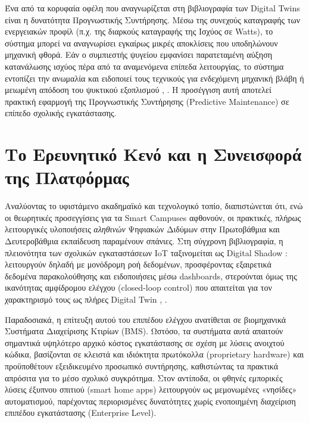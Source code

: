 Ένα από τα κορυφαία οφέλη που αναγνωρίζεται στη βιβλιογραφία των \textlatin{Digital Twins} είναι η δυνατότητα Προγνωστικής Συντήρησης. Μέσω της συνεχούς καταγραφής των ενεργειακών προφίλ (π.χ. της διαρκούς καταγραφής της Ισχύος σε \textlatin{Watts}), το σύστημα μπορεί να αναγνωρίσει εγκαίρως μικρές αποκλίσεις που υποδηλώνουν μηχανική φθορά. Εάν ο συμπιεστής ψυγείου εμφανίσει παρατεταμένη αύξηση κατανάλωσης ισχύος πέρα από τα αναμενόμενα επίπεδα λειτουργίας, το σύστημα εντοπίζει την ανωμαλία και ειδοποιεί τους τεχνικούς για ενδεχόμενη μηχανική βλάβη ή μειωμένη απόδοση του ψυκτικού εξοπλισμού \cite{Cabrera2020}, \cite{Han2022}. Η προσέγγιση αυτή αποτελεί πρακτική εφαρμογή της Προγνωστικής Συντήρησης (\textlatin{Predictive Maintenance}) σε επίπεδο σχολικής εγκατάστασης.

\section{Το Ερευνητικό Κενό και η Συνεισφορά της Πλατφόρμας}
Αναλύοντας το υφιστάμενο ακαδημαϊκό και τεχνολογικό τοπίο, διαπιστώνεται ότι, ενώ οι θεωρητικές προσεγγίσεις για τα \textlatin{Smart Campuses} αφθονούν, οι πρακτικές, πλήρως λειτουργικές υλοποιήσεις \textit{αληθινών} Ψηφιακών Διδύμων στην Πρωτοβάθμια και Δευτεροβάθμια εκπαίδευση παραμένουν σπάνιες. Στη σύγχρονη βιβλιογραφία, η πλειονότητα των σχολικών εγκαταστάσεων \textlatin{IoT} ταξινομείται ως \textlatin{Digital Shadow} \cite{Kritzinger2018}: λειτουργούν δηλαδή με μονόδρομη ροή δεδομένων, προσφέροντας εξαιρετικά δεδομένα παρακολούθησης και ειδοποιήσεις μέσω \textlatin{dashboards}, στερούνται όμως της ικανότητας αμφίδρομου ελέγχου (\textlatin{closed-loop control}) που απαιτείται για τον χαρακτηρισμό τους ως πλήρες \textlatin{Digital Twin} \cite{Grieves2017}, \cite{Fuller2020}.

Παραδοσιακά, η επίτευξη αυτού του επιπέδου ελέγχου ανατίθεται σε βιομηχανικά Συστήματα Διαχείρισης Κτιρίων (\textlatin{BMS}). Ωστόσο, τα συστήματα αυτά απαιτούν σημαντικά υψηλότερο αρχικό κόστος εγκατάστασης σε σχέση με λύσεις ανοιχτού κώδικα, βασίζονται σε κλειστά και ιδιόκτητα πρωτόκολλα (\textlatin{proprietary hardware}) και προϋποθέτουν εξειδικευμένο προσωπικό συντήρησης, καθιστώντας τα πρακτικά απρόσιτα για το μέσο σχολικό συγκρότημα. Στον αντίποδα, οι φθηνές εμπορικές λύσεις έξυπνου σπιτιού (\textlatin{smart home apps}) λειτουργούν ως μεμονωμένες «νησίδες» αυτοματισμού, παρέχοντας περιορισμένες δυνατότητες χωρίς ενοποιημένη διαχείριση επιπέδου εγκατάστασης (\textlatin{Enterprise Level}).

